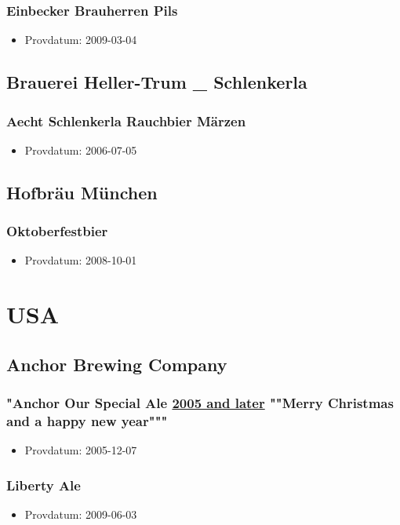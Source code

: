 \documentclass[11pt]{article}
\begin{document}
\subsubsection{Einbecker Brauherren Pils}
\label{sec:orgd00cb30}
\begin{itemize}
\item Provdatum: 2009-03-04
\end{itemize}
\subsection{Brauerei Heller-Trum \_ Schlenkerla}
\label{sec:org208a2a1}
\subsubsection{Aecht Schlenkerla Rauchbier Märzen}
\label{sec:orgaad6e95}
\begin{itemize}
\item Provdatum: 2006-07-05
\end{itemize}
\subsection{Hofbräu München}
\label{sec:orgaadf722}
\subsubsection{Oktoberfestbier}
\label{sec:org9bda264}
\begin{itemize}
\item Provdatum: 2008-10-01
\end{itemize}
\section{USA}
\label{sec:orgc6c9fa1}
\subsection{Anchor Brewing Company}
\label{sec:org1d3ec67}
\subsubsection{"Anchor Our Special Ale \underline{2005 and later} ""Merry Christmas and a happy new year"""}
\label{sec:org9a2f1c6}
\begin{itemize}
\item Provdatum: 2005-12-07
\end{itemize}
\subsubsection{Liberty Ale}
\label{sec:orgb74986a}
\begin{itemize}
\item Provdatum: 2009-06-03
\end{itemize}
\end{document}
